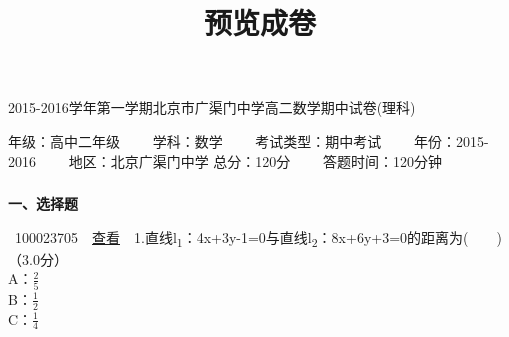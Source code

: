 \documentclass[]{article}
\title{预览成卷}
\date{}
\begin{document}
\maketitle

2015-2016学年第一学期北京市广渠门中学高二数学期中试卷(理科)

年级：高中二年级~~~~ 学科：数学~~~~ 考试类型：期中考试~~~~
年份：2015-2016~~~~ 地区：北京广渠门中学 总分：120分~~~~
答题时间：120分钟~~~~

\subsubsection{}\label{section}

\hypertarget{questionArea}{}
\textbf{一、选择题}

~{{100023705}~~\href{../question/viewQuestionDetail.jsp?questionID=100023705\&testPaperId=100229072}{查看}~~1.直线l\textsubscript{1}：4x+3y-1=0与直线l\textsubscript{2}：8x+6y+3=0的距离为(　　)\\
\hspace*{0.333em}\hspace*{0.333em}（3.0分）\\
\hspace*{0.333em}\hspace*{0.333em}\hspace*{0.333em}\hspace*{0.333em}\hspace*{0.333em}\hspace*{0.333em}\hspace*{0.333em}\hspace*{0.333em}A：$\frac{2}{5}$\protect\hypertarget{_baidu_bookmark_start_0}{}{‍}\\
\hspace*{0.333em}\hspace*{0.333em}\hspace*{0.333em}\hspace*{0.333em}\hspace*{0.333em}\hspace*{0.333em}\hspace*{0.333em}\hspace*{0.333em}B：$\frac{1}{2}$\\
\hspace*{0.333em}\hspace*{0.333em}\hspace*{0.333em}\hspace*{0.333em}\hspace*{0.333em}\hspace*{0.333em}\hspace*{0.333em}\hspace*{0.333em}C：$\frac{1}{4}$\protect\hypertarget{_baidu_bookmark_start_2}{}{‍}\\
}
\end{document}
